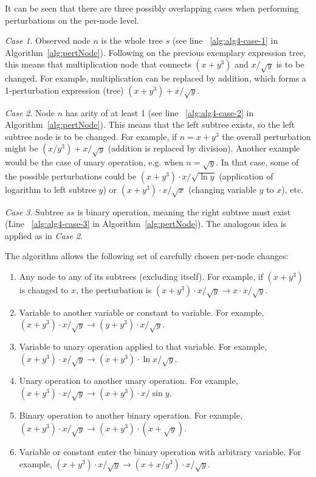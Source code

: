\documentclass[a4paper,12pt]{elsarticle}
\begin{document}
It can be seen that there are three possibly overlapping cases when performing perturbations on the per-node level. 

\emph{Case 1}. 
Observed node $n$ is the whole tree $s$ (see line ~\ref{alg:alg4-case-1} in Algorithm~\ref{alg:pertNode}). Following on   the previous exemplary expression tree, this means that multiplication node that connects $(x+y^3)$ and $x/\sqrt{y}$ is to be changed. For example, multiplication can be replaced by addition, which forms a 1-perturbation expression (tree) $(x+y^3)+ x/\sqrt{y}$. 


\emph{Case 2}. 
Node $n$ has arity of at least 1 (see line ~\ref{alg:alg4-case-2} in Algorithm~\ref{alg:pertNode}). This means that the left subtree exists, so the left subtree node is to be changed. 
For example, if $n=x+y^3$ the overall perturbation might be $(x/y^3)+x/\sqrt{y}$ (addition is replaced by division). 
Another example would be the case of unary operation, e.g. when $n=\sqrt{y}$. In that case, some of the possible perturbations could be $(x+y^3)\cdot x/\sqrt{\ln{y}}$ (application of logarithm to left subtree $y$) or $(x+y^3)\cdot x/\sqrt{x}$ (changing variable $y$ to $x$), etc.

\emph{Case 3}. 
Subtree $ss$ is binary operation, meaning the right subtree must exist (Line ~\ref{alg:alg4-case-3} in Algorithm~\ref{alg:pertNode}). 
The analogous idea is applied as in \emph{Case 2}. 

The algorithm allows the following set of carefully chosen per-node changes:

\begin{enumerate}
	\item Any node to any of its subtrees (excluding itself). For example, if $(x+y^3)$ is changed to $x$, the perturbation is $(x+y^3)\cdot x/\sqrt{y} \rightarrow x\cdot x/\sqrt{y}$. 
	\item Variable to another variable or constant to variable. For example,  $(x+y^3)\cdot x/\sqrt{y} \rightarrow (y+y^3)\cdot x/\sqrt{y}$.
	\item Variable to unary operation applied to that variable. For example,  $(x+y^3)\cdot x/\sqrt{y} \rightarrow (x+y^3)\cdot \ln{x}/\sqrt{y}$.
	\item Unary operation to another unary operation. For example,  $(x+y^3)\cdot x/\sqrt{y} \rightarrow (x+y^3)\cdot x/\sin{y}$.
	\item Binary operation to another binary operation. For example,  $(x+y^3)\cdot x/\sqrt{y} \rightarrow (x+y^3)\cdot (x + \sqrt{y})$. 
	\item Variable or constant enter the binary operation with arbitrary variable. For example,  $(x+y^3)\cdot x/\sqrt{y} \rightarrow (x+x/y^3)\cdot x/\sqrt{y}$. 
\end{enumerate} 
\end{document}
